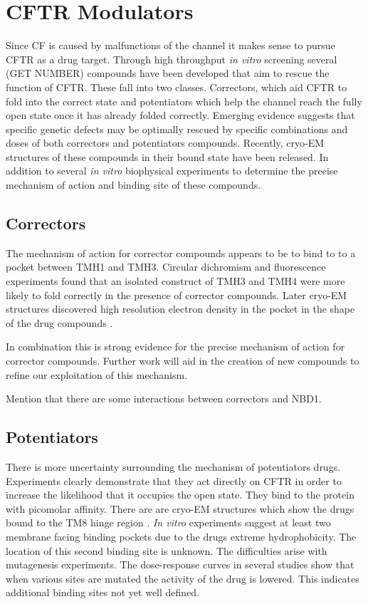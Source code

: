\section{CFTR Modulators}
Since CF is caused by malfunctions of the channel it makes sense to pursue CFTR as a drug target. Through high throughput \textit{in vitro} screening several (GET NUMBER) compounds have been developed that aim to rescue the function of CFTR. These fall into two classes. Correctors, which aid CFTR to fold into the correct state and potentiators which help the channel reach the fully open state once it has already folded correctly. Emerging evidence suggests that specific genetic defects may be optimally rescued by specific combinations and doses of both correctors and potentiators compounds. Recently, cryo-EM structures of these compounds in their bound state have been released. In addition to several \textit {in vitro} biophysical experiments to determine the precise mechanism of action and binding site of these compounds.

\subsection{Correctors}
The mechanism of action for corrector compounds appears to be to bind to to a pocket between TMH1 and TMH3. Circular dichromism and fluorescence experiments found that an isolated construct of TMH3 and TMH4 were more likely to fold correctly in the presence of corrector compounds. Later cryo-EM structures discovered high resolution electron density in the pocket in the shape of the drug compounds \cite{fiedorczuk2022}. 

In combination this is strong evidence for the precise mechanism of action for corrector compounds. Further work will aid in the creation of new compounds to refine our exploitation of this mechanism.

Mention that there are some interactions between correctors and NBD1.

\subsection{Potentiators}
There is more uncertainty surrounding the mechanism of potentiators drugs. Experiments clearly demonstrate that they act directly on CFTR in order to increase the likelihood that it occupies the open state. They bind to the protein with picomolar affinity. There are are cryo-EM structures which show the drugs bound to the TM8 hinge region \cite{}. \textit {In vitro} experiments suggest at least two membrane facing binding pockets due to the drugs extreme hydrophobicity\cite{}. The location of this second binding site is unknown. The difficulties arise with mutagenesis experiments. The dose-response curves in several studies show that when various sites are mutated the activity of the drug is lowered. This indicates additional binding sites not yet well defined. 

